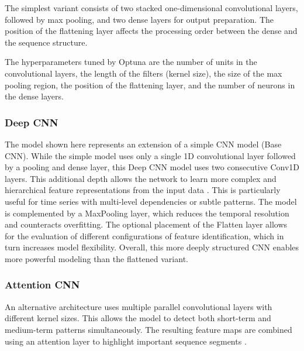 The simplest variant consists of two stacked one-dimensional convolutional layers, followed by max pooling, and two dense layers for output preparation.
The position of the flattening layer affects the processing order between the dense and the sequence structure.

The hyperparameters tuned by Optuna are the number of units in the convolutional layers, the length of the filters (kernel size), the size of the max pooling region, the position of the flattening layer, and the number of neurons in the dense layers.



\subsubsection{Deep CNN}

The model shown here represents an extension of a simple CNN model (Base CNN).
While the simple model uses only a single 1D convolutional layer followed by a pooling and dense layer, this Deep CNN model uses two consecutive Conv1D layers.
This additional depth allows the network to learn more complex and hierarchical feature representations from the input data \cite{cnn-deep-more-complex}.
This is particularly useful for time series with multi-level dependencies or subtle patterns.
The model is complemented by a MaxPooling layer, which reduces the temporal resolution and counteracts overfitting.
The optional placement of the Flatten layer allows for the evaluation of different configurations of feature identification, which in turn increases model flexibility.
Overall, this more deeply structured CNN enables more powerful modeling than the flattened variant.



\subsubsection{Attention CNN}

An alternative architecture uses multiple parallel convolutional layers with different kernel sizes.
This allows the model to detect both short-term and medium-term patterns simultaneously.
The resulting feature maps are combined using an attention layer to highlight important sequence segments \cite{cnn-attention}.

